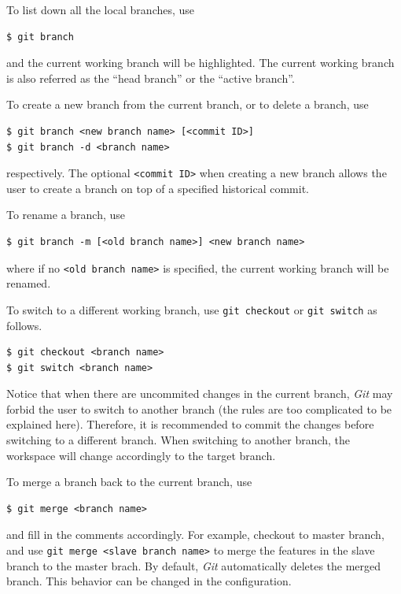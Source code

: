 To list down all the local branches, use
\begin{lstlisting}
$ git branch
\end{lstlisting}
and the current working branch will be highlighted. The current working branch is also referred as the ``head branch'' or the ``active branch''.

To create a new branch from the current branch, or to delete a branch, use
\begin{lstlisting}
$ git branch <new branch name> [<commit ID>]
$ git branch -d <branch name>
\end{lstlisting}
respectively. The optional \verb|<commit ID>| when creating a new branch allows the user to create a branch on top of a specified historical commit.

To rename a branch, use
\begin{lstlisting}
$ git branch -m [<old branch name>] <new branch name>
\end{lstlisting}
where if no \verb|<old branch name>| is specified, the current working branch will be renamed.

To switch to a different working branch, use \verb|git checkout| or \verb|git switch| as follows.
\begin{lstlisting}
$ git checkout <branch name>
$ git switch <branch name>
\end{lstlisting}
Notice that when there are uncommited changes in the current branch, \textit{Git} may forbid the user to switch to another branch (the rules are too complicated to be explained here). Therefore, it is recommended to commit the changes before switching to a different branch. When switching to another branch, the workspace will change accordingly to the target branch.

To merge a branch back to the current branch, use
\begin{lstlisting}
$ git merge <branch name>
\end{lstlisting}
and fill in the comments accordingly. For example, checkout to master branch, and use \verb|git merge <slave branch name>| to merge the features in the slave branch to the master brach. By default, \textit{Git} automatically deletes the merged branch. This behavior can be changed in the configuration.

